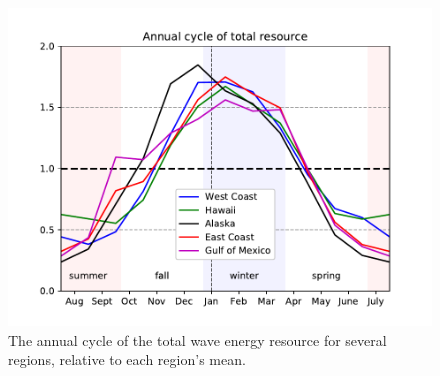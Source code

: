 

\begin{figure}[ht]
  \centering
  \includegraphics[width=\textwidth]{./fig/AnnualCycle01.pdf}
  \caption[Wave resource annual cycle.]{The annual cycle of the total wave energy resource for several regions, relative to each region's mean.}
  \label{fig:annual-cycle}
\end{figure}



